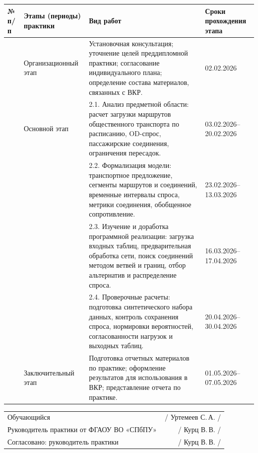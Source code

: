 \documentclass[12pt,a4paper]{article}
\newcommand{\sigline}[1]{\underline{\hspace{42mm}}\,/ #1 /}
\begin{document}
\small
\begin{longtable}{|>{\centering\arraybackslash}p{}|p{}|p{}|p{}|}
\hline
№ п/п & Этапы (периоды) практики & Вид работ & Сроки прохождения этапа\\
\hline
1 & Организацион\-ный этап &
Установочная консультация; уточнение целей преддипломной практики; согласование индивидуального плана; определение состава материалов, связанных с ВКР. &
02.02.2026\\
\hline
2 & Основной этап &
2.1. Анализ предметной области: расчет загрузки маршрутов общественного транспорта по расписанию, OD-спрос, пассажирские соединения, ограничения пересадок. &
03.02.2026--20.02.2026\\
\cline{3-4}
 & &
2.2. Формализация модели: транспортное предложение, сегменты маршрутов и соединений, временные интервалы спроса, метрики соединения, обобщенное сопротивление. &
23.02.2026--13.03.2026\\
\cline{3-4}
 & &
2.3. Изучение и доработка программной реализации: загрузка входных таблиц, предварительная обработка сети, поиск соединений методом ветвей и границ, отбор альтернатив и распределение спроса. &
16.03.2026--17.04.2026\\
\cline{3-4}
 & &
2.4. Проверочные расчеты: подготовка синтетического набора данных, контроль сохранения спроса, нормировки вероятностей, согласованности нагрузок и выходных таблиц. &
20.04.2026--30.04.2026\\
\hline
3 & Заключительный этап &
Подготовка отчетных материалов по практике; оформление результатов для использования в ВКР; представление отчета по практике. &
01.05.2026--07.05.2026\\
\hline
\end{longtable}

\normalsize
\vspace{1.0em}

\begin{tabularx}{\textwidth}{@{}Xr@{}}
Обучающийся & \sigline{Уртемеев С.\,А.}\\[1.2em]
Руководитель практики от ФГАОУ ВО «СПбПУ» & \sigline{Курц В.\,В.}\\[1.2em]
Согласовано: руководитель практики & \sigline{Курц В.\,В.}\\
\end{tabularx}
\end{document}

